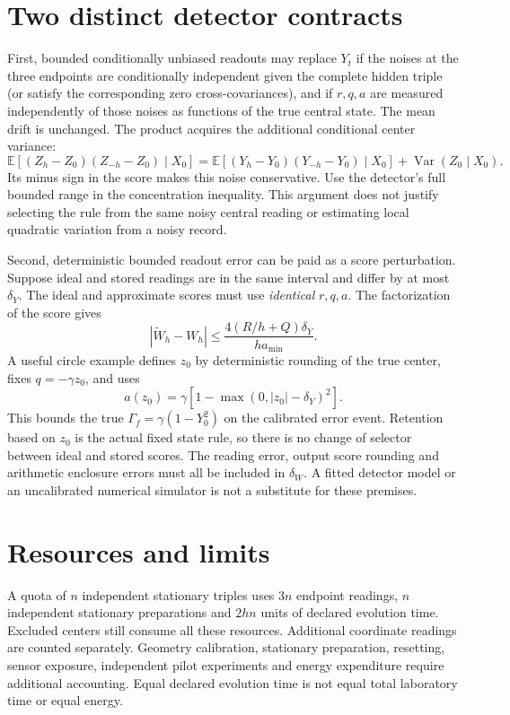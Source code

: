 \section{Two distinct detector contracts}
First, bounded conditionally unbiased readouts may replace $Y_t$ if the noises
at the three endpoints are conditionally independent given the complete
hidden triple (or satisfy the corresponding zero cross-covariances), and if
$r,q,a$ are measured independently of those noises as functions of the true
central state. The mean drift is unchanged. The product acquires the
additional conditional center variance:
\begin{equation}
 \mathbb E[(Z_h-Z_0)(Z_{-h}-Z_0)\mid X_0]
 =\mathbb E[(Y_h-Y_0)(Y_{-h}-Y_0)\mid X_0]
   +\operatorname{Var}(Z_0\mid X_0).
\end{equation}
Its minus sign in the score makes this noise conservative. Use the detector's
full bounded range in the concentration inequality. This argument does not
justify selecting the rule from the same noisy central reading or estimating
local quadratic variation from a noisy record.

Second, deterministic bounded readout error can be paid as a score
perturbation. Suppose ideal and stored readings are in the same interval and
differ by at most $\delta_Y$. The ideal and approximate scores must use
\emph{identical} $r,q,a$. The factorization of the score gives
\begin{equation}
 |\widetilde W_h-W_h|
 \le\frac{4(R/h+Q)\delta_Y}{h a_{\min}}.
 \label{eq:og-finite-reading-error}
\end{equation}
A useful circle example defines $z_0$ by deterministic rounding of the true
center, fixes $q=-\gamma z_0$, and uses
\begin{equation}
 a(z_0)=\gamma\left[1-\max(0,|z_0|-\delta_Y)^2\right].
\end{equation}
This bounds the true $\Gamma_f=\gamma(1-Y_0^2)$ on the calibrated error event.
Retention based on $z_0$ is the actual fixed state rule, so there is no change
of selector between ideal and stored scores. The reading error, output score
rounding and arithmetic enclosure errors must all be included in
$\delta_W$. A fitted detector model or an uncalibrated numerical simulator is
not a substitute for these premises.

\section{Resources and limits}
A quota of $n$ independent stationary triples uses $3n$ endpoint readings,
$n$ independent stationary preparations and $2hn$ units of declared evolution
time. Excluded centers still consume all these resources. Additional
coordinate readings are counted separately. Geometry calibration, stationary
preparation, resetting, sensor exposure, independent pilot experiments and
energy expenditure require additional accounting. Equal declared evolution
time is not equal total laboratory time or equal energy.

